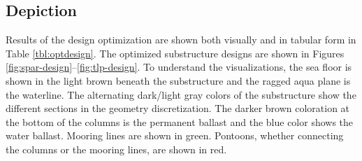 \subsection{Depiction}
Results of the design optimization are shown both visually and in
tabular form in Table \ref{tbl:optdesign}.  The optimized substructure
designs are shown in Figures
\ref{fig:spar-design}--\ref{fig:tlp-design}.  To understand the
visualizations, the sea floor is shown in the light brown beneath the
substructure and the ragged aqua plane is the waterline.  The
alternating dark/light gray colors of the substructure show the
different sections in the geometry discretization.  The darker brown
coloration at the bottom of the columns is the permanent ballast and the
blue color shows the water ballast.  Mooring lines are shown in green.
Pontoons, whether connecting the columns or the mooring lines, are shown
in red.

